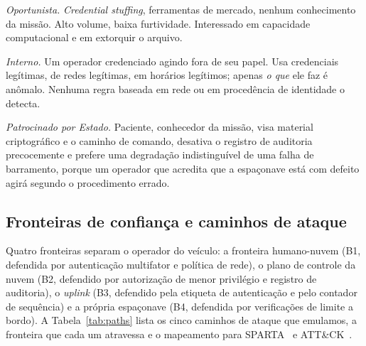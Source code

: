 \documentclass[conference]{IEEEtran}
\begin{document}
\emph{Oportunista.} \emph{Credential stuffing}, ferramentas de mercado, nenhum
conhecimento da missão. Alto volume, baixa furtividade. Interessado em
capacidade computacional e em extorquir o arquivo.

\emph{Interno.} Um operador credenciado agindo fora de seu papel. Usa
credenciais legítimas, de redes legítimas, em horários legítimos; apenas
\emph{o que} ele faz é anômalo. Nenhuma regra baseada em rede ou em
procedência de identidade o detecta.

\emph{Patrocinado por Estado.} Paciente, conhecedor da missão, visa material
criptográfico e o caminho de comando, desativa o registro de auditoria
precocemente e prefere uma degradação indistinguível de uma falha de barramento,
porque um operador que acredita que a espaçonave está com defeito agirá
segundo o procedimento errado.

\subsection{Fronteiras de confiança e caminhos de ataque}

Quatro fronteiras separam o operador do veículo: a fronteira humano-nuvem (B1,
defendida por autenticação multifator e política de rede), o plano de controle
da nuvem (B2, defendido por autorização de menor privilégio e registro de
auditoria), o \emph{uplink} (B3, defendido pela etiqueta de autenticação e pelo
contador de sequência) e a própria espaçonave (B4, defendida por verificações de
limite a bordo). A Tabela~\ref{tab:paths} lista os cinco caminhos de ataque que
emulamos, a fronteira que cada um atravessa e o mapeamento para
SPARTA~\cite{sparta} e ATT\&CK~\cite{attack}.
\end{document}
